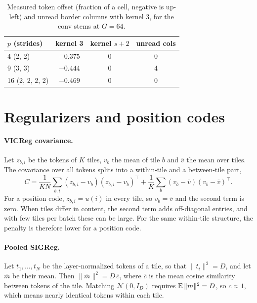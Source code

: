 \begin{table}[h]
  \centering
  \small
  \caption{Measured token offset (fraction of a cell, negative is up-left) and unread border columns with kernel 3, for the conv stems at $G{=}64$.}
  \label{tab:supp_shift}
  \begin{tabular}{@{}lccc@{}}
    \toprule
    $p$ (strides) & kernel 3 & kernel $s{+}2$ & unread cols \\
    \midrule
    4 (2, 2)          & $-0.375$ & 0 & 0 \\
    9 (3, 3)          & $-0.444$ & 0 & 4 \\
    16 (2, 2, 2, 2)   & $-0.469$ & 0 & 0 \\
    \bottomrule
  \end{tabular}
\end{table}

\section{Regularizers and position codes}
\label{sec:supp_reg}

\paragraph{VICReg covariance.} Let $z_{b,i}$ be the tokens of $K$ tiles, $v_b$ the mean of tile $b$ and $\bar v$ the mean over tiles. The covariance over all tokens splits into a within-tile and a between-tile part,
\begin{equation}
  C = \frac{1}{KN}\sum_{b,i}(z_{b,i}-v_b)(z_{b,i}-v_b)^\top + \frac{1}{K}\sum_b (v_b-\bar v)(v_b-\bar v)^\top.
\end{equation}
For a position code, $z_{b,i} = u(i)$ in every tile, so $v_b = \bar v$ and the second term is zero. When tiles differ in content, the second term adds off-diagonal entries, and with few tiles per batch these can be large. For the same within-tile structure, the penalty is therefore lower for a position code.

\paragraph{Pooled SIGReg.} Let $t_1, \dots, t_N$ be the layer-normalized tokens of a tile, so that $\|t_i\|^2 = D$, and let $\bar m$ be their mean. Then $\|\bar m\|^2 = D\,\bar c$, where $\bar c$ is the mean cosine similarity between tokens of the tile. Matching $\mathcal{N}(0, I_D)$ requires $\operatorname*{\mathbb{E}}\|\bar m\|^2 = D$, so $\bar c \approx 1$, which means nearly identical tokens within each tile.

